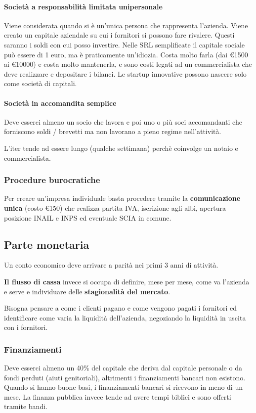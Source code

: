 \paragraph{Società a responsabilità limitata unipersonale}
Viene considerata quando si è un'unica persona che rappresenta l'azienda. Viene creato un capitale aziendale su cui i fornitori si possono fare rivalere. Questi saranno i soldi con cui posso investire. Nelle SRL semplificate il capitale sociale può essere di 1 euro, ma è praticamente un'idiozia. Costa molto farla (dai €1500 ai €10000) e costa molto mantenerla, e sono costi legati ad un commercialista che deve realizzare e depositare i bilanci. Le startup innovative possono nascere solo come società di capitali.

\paragraph{Società in accomandita semplice}
Deve esserci almeno un socio che lavora e poi uno o più soci accomandanti che forniscono soldi / brevetti ma non lavorano a pieno regime nell'attività.

L'iter tende ad essere lungo (qualche settimana) perchè coinvolge un notaio e commercialista.

\subsubsection{Procedure burocratiche}
Per creare un'impresa individuale basta procedere tramite la \textbf{comunicazione unica} (costo €150) che realizza partita IVA, iscrizione agli albi, apertura posizione INAIL e INPS ed eventuale SCIA in comune.

\subsection{Parte monetaria}
Un conto economico deve arrivare a parità nei primi 3 anni di attività.

\textbf{Il flusso di cassa} invece si occupa di definire, mese per mese, come va l'azienda e serve e individuare delle \textbf{stagionalità del mercato}.

Bisogna pensare a come i clienti pagano e come vengono pagati i fornitori ed identificare come varia la liquidità dell'azienda, negoziando la liquidità in uscita con i fornitori.

\subsubsection{Finanziamenti}
Deve esserci almeno un 40\% del capitale che deriva dal capitale personale o da fondi perduti (aiuti genitoriali), altrimenti i finanziamenti bancari non esistono. Quando si hanno buone basi, i finanziamenti bancari si ricevono in meno di un mese. La finanza pubblica invece tende ad avere tempi biblici e sono offerti tramite bandi.

